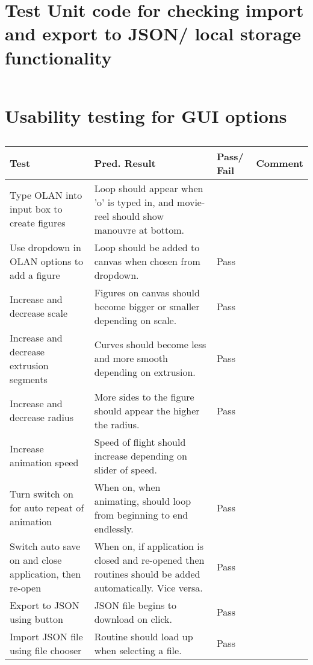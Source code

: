 \section{Test Unit code for checking import and export to JSON/ local storage functionality}
\label{test:save}
\begin{figure}[h!]
\caption{}
\begin{lstlisting}
\end{lstlisting}
\end{figure}

\section{Usability testing for GUI options}
\begin{table}[h]
\begin{tabular}{|p{4.5cm}|p{4.5cm}|p{2cm}|p{2.5cm}|}
\hline
\textbf{Test} & \textbf{Pred. Result} & \textbf{Pass/ Fail} & \textbf{Comment}                        \\ \hline
Type OLAN into input box to create figures    &  Loop should appear when 'o' is typed in, and movie-reel should show manouvre at bottom.  &            &     \\ \hline
Use dropdown in OLAN options to add a figure    &  Loop should be added to canvas when chosen from dropdown.  &     Pass       &     \\ \hline
Increase and decrease scale    &  Figures on canvas should become bigger or smaller depending on scale.  &       Pass     &     \\ \hline
Increase and decrease extrusion segments    &  Curves should become less and more smooth depending on extrusion.  &       Pass     &     \\ \hline
Increase and decrease radius    &  More sides to the figure should appear the higher the radius.  &     Pass       &     \\ \hline
Increase animation speed    &   Speed of flight should increase depending on slider of speed. &            &     \\ \hline
Turn switch on for auto repeat of animation    &  When on, when animating, should loop from beginning to end endlessly.  &       Pass     &     \\ \hline
Switch auto save on and close application, then re-open    &  When on, if application is closed and re-opened then routines should be added automatically. Vice versa.  &       Pass     &     \\ \hline
Export to JSON using button    &  JSON file begins to download on click.  &      Pass      &     \\ \hline
Import JSON file using file chooser  &  Routine should load up when selecting a file.  &      Pass      &     \\ \hline
\end{tabular}
\label{test:options}
\caption{}
\end{table}

